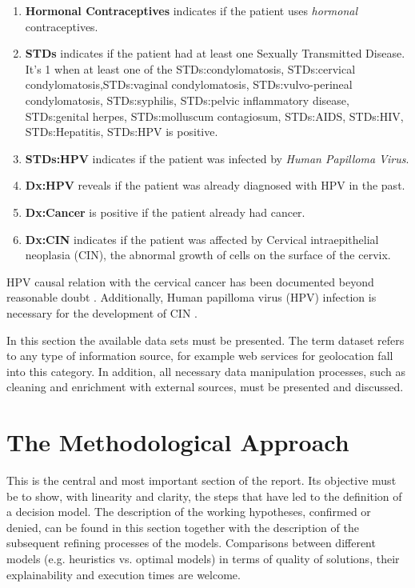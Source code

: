 \begin{enumerate}
    \item \textbf{Hormonal Contraceptives} indicates if the patient uses \textit{hormonal} contraceptives.
    \item \textbf{STDs} indicates if the patient had at least one Sexually Transmitted Disease. It's 1 when at least one of the STDs:condylomatosis, STDs:cervical condylomatosis,STDs:vaginal condylomatosis, STDs:vulvo-perineal condylomatosis, STDs:syphilis, STDs:pelvic inflammatory disease, STDs:genital herpes, STDs:molluscum contagiosum, STDs:AIDS, STDs:HIV, STDs:Hepatitis, STDs:HPV is positive.
    \item \textbf{STDs:HPV} indicates if the patient was infected by \textit{Human Papilloma Virus}.
    \item \textbf{Dx:HPV} reveals if the patient was already diagnosed with HPV in the past.
    
    \item \textbf{Dx:Cancer} is positive if the patient already had cancer.
    \item \textbf{Dx:CIN} indicates if the patient was affected by Cervical intraepithelial neoplasia (CIN), the abnormal growth of cells on the surface of the cervix.
\end{enumerate}

HPV causal relation with the cervical cancer has been documented beyond reasonable doubt \cite{Bosch2002}. Additionally, Human papilloma virus (HPV) infection is necessary for the development of CIN \cite{kumar2017robbins}.

In this section the available data sets must be presented. The term dataset refers to any type of information source, for example web services for geolocation fall into this category. 
In addition, all necessary data manipulation processes, such as cleaning and enrichment with external sources, must be presented and discussed.

\section{The Methodological Approach}

This is the central and most important section of the report. Its objective must be to show, with linearity and clarity, the steps that have led to the definition of a decision model. The description of the working hypotheses, confirmed or denied, can be found in this section together with the description of the subsequent refining processes of the models. Comparisons between different models (e.g. heuristics vs. optimal models) in terms of quality of solutions, their explainability and execution times are welcome. 

